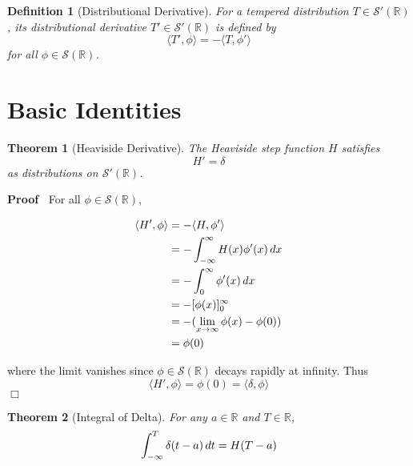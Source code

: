 \documentclass{article}
\newenvironment{proof}{\noindent\textbf{Proof\ }}{\hspace*{\fill}$\Box$\medskip}
\newtheorem{definition}{Definition}
\newtheorem{theorem}{Theorem}
\begin{document}
\begin{definition}
  [Distributional Derivative] For a tempered distribution $T \in \mathcal{S}'
  (\mathbb{R})$, its distributional derivative $T' \in \mathcal{S}'
  (\mathbb{R})$ is defined by
  \[ \langle T', \phi \rangle = - \langle T, \phi' \rangle \]
  for all $\phi \in \mathcal{S} (\mathbb{R})$.
\end{definition}

\section{Basic Identities}

\begin{theorem}
  [Heaviside Derivative] The Heaviside step function $H$ satisfies
  \begin{equation}
    H' = \delta
  \end{equation}
  as distributions on $\mathcal{S}' (\mathbb{R})$.
\end{theorem}

\begin{proof}
  For all $\phi \in \mathcal{S} (\mathbb{R})$,
  
  \begin{align}
    \langle H', \phi \rangle & = - \langle H, \phi' \rangle \\
    & = - \int_{- \infty}^{\infty} H (x) \phi' (x)  \hspace{0.17em} dx \\
    & = - \int_0^{\infty} \phi' (x)  \hspace{0.17em} dx \\
    & = - [\phi (x)]_0^{\infty} \\
    & = - (\lim_{x \to \infty} \phi (x) - \phi (0)) \\
    & = \phi (0) 
  \end{align}
  
  where the limit vanishes since $\phi \in \mathcal{S} (\mathbb{R})$ decays
  rapidly at infinity. Thus
  \begin{equation}
    \langle H', \phi \rangle = \phi (0) = \langle \delta, \phi \rangle
  \end{equation}
\end{proof}

\begin{theorem}
  [Integral of Delta] For any $a \in \mathbb{R}$ and $T \in \mathbb{R}$,
  \begin{equation}
    \int_{- \infty}^T \delta (t - a)  \hspace{0.17em} dt = H (T - a)
  \end{equation}
\end{theorem}
\end{document}
